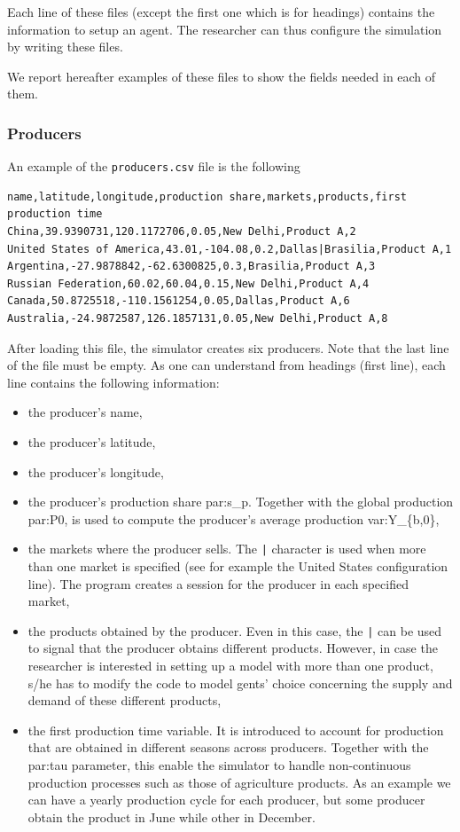 \documentclass{article}
\begin{document}
Each line of these files (except the first one which is for headings) contains the information to setup an agent. The researcher can thus configure the simulation by writing these files.

We report hereafter examples of these files to show the fields needed in each of them.

\subsubsection{Producers}
An example of the \verb+producers.csv+ file is the following 

\begin{verbatim}
name,latitude,longitude,production share,markets,products,first production time
China,39.9390731,120.1172706,0.05,New Delhi,Product A,2
United States of America,43.01,-104.08,0.2,Dallas|Brasilia,Product A,1
Argentina,-27.9878842,-62.6300825,0.3,Brasilia,Product A,3
Russian Federation,60.02,60.04,0.15,New Delhi,Product A,4
Canada,50.8725518,-110.1561254,0.05,Dallas,Product A,6
Australia,-24.9872587,126.1857131,0.05,New Delhi,Product A,8

\end{verbatim}

After loading this file, the simulator creates six producers. Note that the last line of the file must be empty.
As one can understand from headings (first line), each line contains the following information:
\begin{itemize}
	\item the producer's name,
	\item the producer's latitude,
	\item the producer's longitude,
	\item the producer's production share \gls{par:s_p}. Together with the global production \gls{par:P0}, is used to compute the producer's average production \gls{var:Y_{b,0}},
	\item the markets where the producer sells. The \verb+|+ character is used when more than one market is specified (see for example the United States configuration line). The program creates a session for the producer in each specified market,
	\item the products obtained by the producer. Even in this case, the \verb+|+ can be used to signal that the producer obtains different products. However, in case the researcher is interested in setting up a model with more than one product, s/he has to modify the code to model gents' choice concerning the supply and demand of these different products,
	\item the first production time variable. It is introduced to account for production that are obtained in different seasons across producers. Together with the \gls{par:tau} parameter, this enable the simulator to handle non-continuous production processes such as those of agriculture products. As an example we can have a yearly production cycle for each producer, but some producer obtain the product in June while other in December.
\end{itemize}
\end{document}
